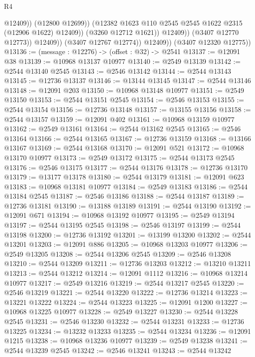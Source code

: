 \begin{lexlean}{R4}
\begin{coremodule}
                                @12409))
                            (@12800 @12699))
                          (@12382 @1623 @110 @2545 @2545 @1622 @2315 (@12906 @1622) @12409))
                        (@3260 @12712 @1621))
                      @12409))
                  (@3407 @12770 @12773))
                @12409))
            (@3407 @12767 @12774))
          @12409))
      (@3407 @12320 @12775))
@13136 := (message : @12276) -> (offset : @32) -> @2541
@13137 := @12091 @38
@13139 := @10968 @13137 @10977
@13140 := @2549 @13139
@13142 := @2544 @13140 @2545
@13143 := @2546 @13142
@13144 := @2544 @13143
@13145 := @12736 @13137
@13146 := @13144 @13145
@13147 := @2544 @13146
@13148 := @12091 @203
@13150 := @10968 @13148 @10977
@13151 := @2549 @13150
@13153 := @2544 @13151 @2545
@13154 := @2546 @13153
@13155 := @2544 @13154
@13156 := @12736 @13148
@13157 := @13155 @13156
@13158 := @2544 @13157
@13159 := @12091 @402
@13161 := @10968 @13159 @10977
@13162 := @2549 @13161
@13164 := @2544 @13162 @2545
@13165 := @2546 @13164
@13166 := @2544 @13165
@13167 := @12736 @13159
@13168 := @13166 @13167
@13169 := @2544 @13168
@13170 := @12091 @521
@13172 := @10968 @13170 @10977
@13173 := @2549 @13172
@13175 := @2544 @13173 @2545
@13176 := @2546 @13175
@13177 := @2544 @13176
@13178 := @12736 @13170
@13179 := @13177 @13178
@13180 := @2544 @13179
@13181 := @12091 @623
@13183 := @10968 @13181 @10977
@13184 := @2549 @13183
@13186 := @2544 @13184 @2545
@13187 := @2546 @13186
@13188 := @2544 @13187
@13189 := @12736 @13181
@13190 := @13188 @13189
@13191 := @2544 @13190
@13192 := @12091 @671
@13194 := @10968 @13192 @10977
@13195 := @2549 @13194
@13197 := @2544 @13195 @2545
@13198 := @2546 @13197
@13199 := @2544 @13198
@13200 := @12736 @13192
@13201 := @13199 @13200
@13202 := @2544 @13201
@13203 := @12091 @886
@13205 := @10968 @13203 @10977
@13206 := @2549 @13205
@13208 := @2544 @13206 @2545
@13209 := @2546 @13208
@13210 := @2544 @13209
@13211 := @12736 @13203
@13212 := @13210 @13211
@13213 := @2544 @13212
@13214 := @12091 @1112
@13216 := @10968 @13214 @10977
@13217 := @2549 @13216
@13219 := @2544 @13217 @2545
@13220 := @2546 @13219
@13221 := @2544 @13220
@13222 := @12736 @13214
@13223 := @13221 @13222
@13224 := @2544 @13223
@13225 := @12091 @1200
@13227 := @10968 @13225 @10977
@13228 := @2549 @13227
@13230 := @2544 @13228 @2545
@13231 := @2546 @13230
@13232 := @2544 @13231
@13233 := @12736 @13225
@13234 := @13232 @13233
@13235 := @2544 @13234
@13236 := @12091 @1215
@13238 := @10968 @13236 @10977
@13239 := @2549 @13238
@13241 := @2544 @13239 @2545
@13242 := @2546 @13241
@13243 := @2544 @13242

\end{coremodule}
\end{lexlean}
